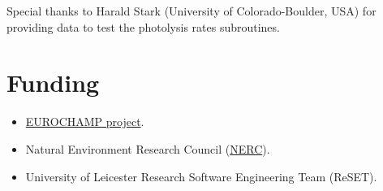Special thanks to Harald Stark (University of Colorado-Boulder, USA)
for providing data to test the photolysis rates subroutines.

\section{Funding} \label{sec:funding}

\begin{itemize}
\item \href{https://www.eurochamp.org/}{EUROCHAMP project}.
\item Natural Environment Research Council
  (\href{https://nerc.ukri.org/}{NERC}).
\item University of Leicester Research Software Engineering Team
  (ReSET).
\end{itemize}
